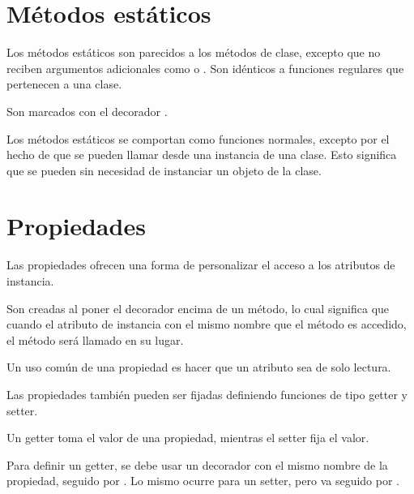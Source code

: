 
\section{Métodos estáticos}

Los métodos estáticos son parecidos a los métodos de clase, excepto que no reciben argumentos adicionales como  o .
Son idénticos a funciones regulares que pertenecen a una clase.

Son marcados con el decorador .


Los métodos estáticos se comportan como funciones normales, excepto por el hecho de que se pueden llamar desde una instancia de una clase.
Esto significa que se pueden sin necesidad de instanciar un objeto de la clase.

\section{Propiedades}

Las propiedades ofrecen una forma de personalizar el acceso a los atributos de instancia.

Son creadas al poner el decorador  encima de un método, lo cual significa que cuando el atributo de instancia con el mismo nombre que el método es accedido, el método será llamado en su lugar.

Un uso común de una propiedad es hacer que un atributo sea de solo lectura.



Las propiedades también pueden ser fijadas definiendo funciones de tipo getter y setter.

Un getter toma el valor de una propiedad, mientras el setter fija el valor.

Para definir un getter, se debe usar un decorador con el mismo nombre de la propiedad, seguido por .
Lo mismo ocurre para un setter, pero va seguido por .


\clearpage